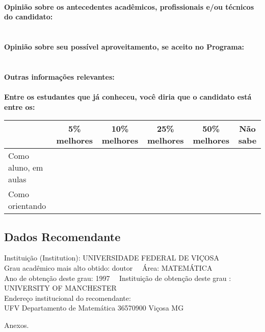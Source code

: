\documentclass[11pt]{article}
\begin{document}
\\
\textbf{Opinião sobre os antecedentes acadêmicos, profissionais e/ou técnicos do candidato:}
\\\\
\\
\textbf{Opinião sobre seu possível aproveitamento, se aceito no Programa:}
\\\\ 
\\
\textbf{Outras informações relevantes:} \\
\\[0.3cm]
\textbf{Entre os estudantes que já conheceu, você diria que o candidato está entre os:}
\\
\begin{tabular}{|l|c|c|c|c|c|}
\hline
 & 5\% melhores & 10\% melhores & 25\% melhores & 50\% melhores & Não sabe \\
\hline
Como aluno, em aulas &  &  &  &  & \\
\hline
Como orientando &  &  &  &  & \\
\hline
\end{tabular}
\subsection*{Dados Recomendante} 
	Instituição (Institution): UNIVERSIDADE FEDERAL DE VIÇOSA
\\ 
	Grau acadêmico mais alto obtido: doutor
	\ \ Área: MATEMÁTICA
	\\
	Ano de obtenção deste grau: 1997
	\ \ 
	Instituição de obtenção deste grau : UNIVERSITY OF MANCHESTER
	\\ 
	Endereço institucional do recomendante: \\ UFV  Departamento de Matemática
36570900  Viçosa  MG 
\begin{center}
Anexos.
\end{center}
\end{document}
